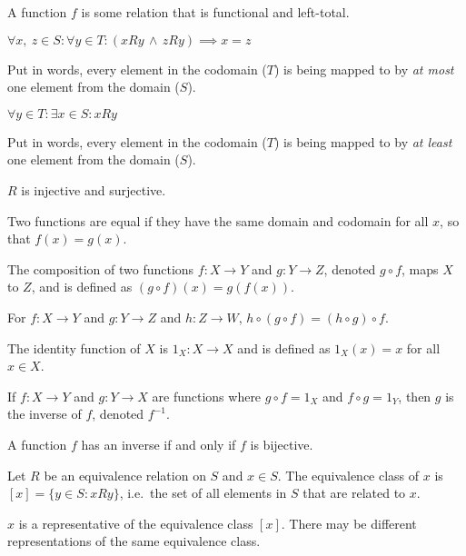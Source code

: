 \documentclass{article}
\begin{document}
\begin{definition}
    A function \(f\) is some relation that is functional and left-total.
\end{definition}
%
\begin{tcolorboxlarge}[title={Function Properties}]
    \begin{description}[style=sameline]
        \item[Injective (one-to-one)]
            \(\forall x,\: z \in S : \forall y \in T
            : (xRy \,\land\, zRy) \implies x = z\)

            Put in words, every element in the codomain (\(T\))
            is being mapped to by \textit{at most} one element from the domain (\(S\)).
        \item[Surjective (onto)]
            \(\forall y \in T : \exists x \in S : xRy\)

            Put in words, every element in the codomain (\(T\))
            is being mapped to by \textit{at least} one element from the domain (\(S\)).
        \item[Bijective]
            \(R\) is injective and surjective.
    \end{description}
\end{tcolorboxlarge}
%
\begin{definition}
    Two functions are equal if they have the same domain and codomain
    for all \(x\), so that \(f(x) = g(x)\).
\end{definition}
%
\begin{definition}
    The composition of two functions \(f:X \to Y\) and \(g:Y \to Z\),
    denoted \(g \circ f\), maps \(X\) to \(Z\), and is defined as
    \((g \circ f)(x) = g(f(x))\).
\end{definition}
%
\begin{theorem}
    For \(f:X \to Y\) and \(g:Y \to Z\) and  \(h:Z \to W\),
    \(h \circ (g \circ f) = (h \circ g) \circ f\).
\end{theorem}
%
\begin{definition}
    The identity function of \(X\) is \(1_X:X \to X\) and is defined as
    \(1_X (x)=x\) for all \(x \in X\).
\end{definition}
%
\begin{definition}
    If \(f:X \to Y\) and \(g:Y \to X\) are functions where
    \(g \circ f = 1_X\) and \(f \circ g = 1_Y\),
    then \(g\) is the inverse of \(f\), denoted \(f^{-1}\).
\end{definition}
%
\begin{theorem}
    A function \(f\) has an inverse if and only if \(f\) is bijective.
\end{theorem}
%
\begin{definition}
    Let \(R\) be an equivalence relation on \(S\) and \(x \in S\).
    The equivalence class of \(x\) is \([x] = \{y \in S : xRy\}\),
    i.e.\ the set of all elements in \(S\) that are related to \(x\).

    \(x\) is a representative of the equivalence class \([x]\).
    There may be different representations of the same equivalence class.
\end{definition}
%
\end{document}
